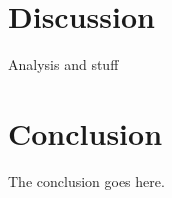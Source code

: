 \documentclass[9pt, conference]{IEEEtran}
\begin{document}
\section{Discussion}
Analysis and stuff
\section{Conclusion}
The conclusion goes here.

\newpage




\end{document}
